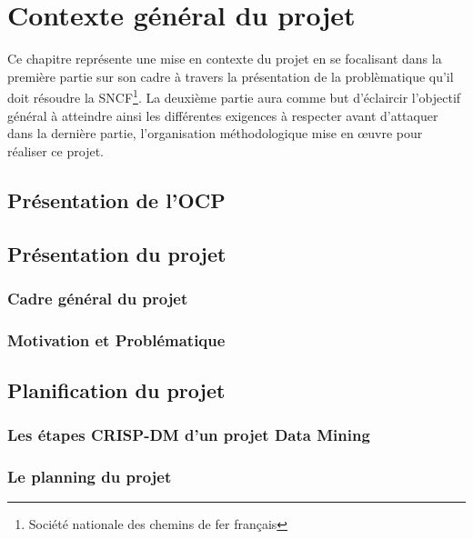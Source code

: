 \chapter{Contexte général du projet}

Ce chapitre représente une mise en contexte du projet en se focalisant dans la première partie sur son cadre à travers la présentation de la problèmatique qu'il doit résoudre la SNCF\footnote{Société nationale des chemins de fer français}. La deuxième partie aura comme but d'éclaircir l'objectif général à atteindre ainsi les différentes exigences à respecter avant d'attaquer dans la dernière partie, l'organisation méthodologique mise en œuvre pour réaliser ce projet\cite{goossens93}.
\cleardoublepage

\section{Présentation de l’OCP}

	
\section{Présentation du projet}
	\subsection{Cadre général du projet}
	\subsection{Motivation et Problématique}


\section{Planification du projet}
	\subsection{Les étapes CRISP-DM d'un projet Data Mining}
	\subsection{Le planning du projet}